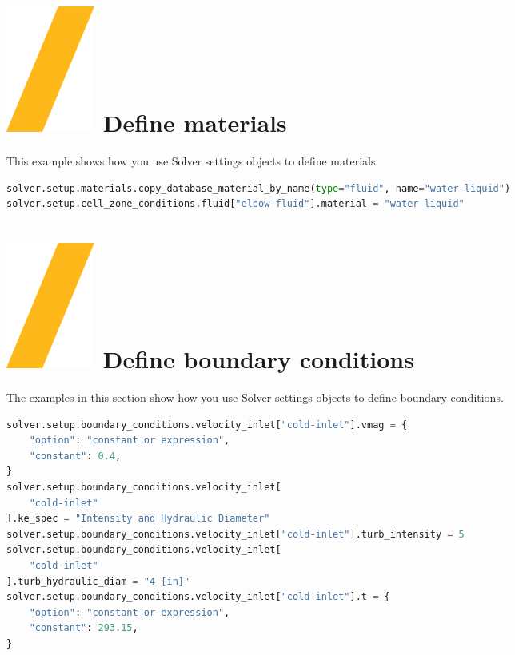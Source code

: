 \documentclass[9pt,landscape]{article}
\begin{document}
\begin{multicols}{3}
{%
\vfill
\section{\includegraphics[height=\fontcharht\font`\S]{slash.png}  Define materials}
This example shows how you use Solver settings objects to define materials.
\begin{lstlisting}[language=Python]
solver.setup.materials.copy_database_material_by_name(type="fluid", name="water-liquid")
solver.setup.cell_zone_conditions.fluid["elbow-fluid"].material = "water-liquid"
\end{lstlisting} 

\section{\includegraphics[height=\fontcharht\font`\S]{slash.png}  Define boundary conditions}

The examples in this section show how you use Solver settings objects to define boundary conditions.

\begin{lstlisting}[language=Python]
solver.setup.boundary_conditions.velocity_inlet["cold-inlet"].vmag = {
    "option": "constant or expression",
    "constant": 0.4,
}
solver.setup.boundary_conditions.velocity_inlet[
    "cold-inlet"
].ke_spec = "Intensity and Hydraulic Diameter"
solver.setup.boundary_conditions.velocity_inlet["cold-inlet"].turb_intensity = 5
solver.setup.boundary_conditions.velocity_inlet[
    "cold-inlet"
].turb_hydraulic_diam = "4 [in]"
solver.setup.boundary_conditions.velocity_inlet["cold-inlet"].t = {
    "option": "constant or expression",
    "constant": 293.15,
}
\end{lstlisting} 

}
\end{multicols}
\end{document}
